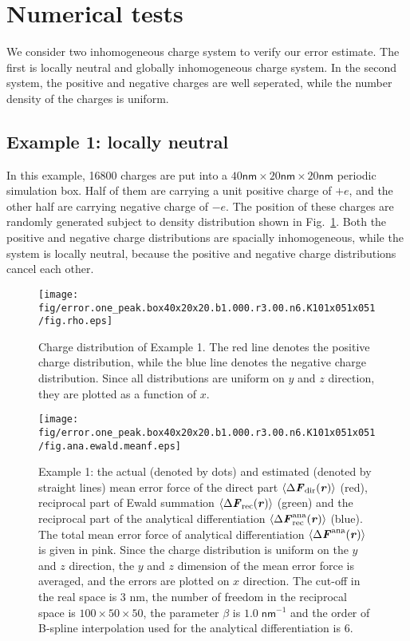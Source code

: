 \documentclass[aps,pre,preprint]{revtex4-1}
\renewcommand{\v}[1]{\textbf{\textit{#1}}}
\begin{document}
\section{Numerical tests}

We consider two inhomogeneous charge system to verify our error
estimate.  The first is locally neutral and globally inhomogeneous
charge system. In the second system, the positive and negative charges
are well seperated, while the number density of the charges is
uniform.

\subsection{Example 1: locally neutral}

In this example, 16800 charges are put into a $40\textsf{nm}\times
20\textsf{nm}\times 20\textsf{nm}$ periodic simulation box. Half of
them are carrying a unit positive charge of $+e$, and the other half
are carrying negative charge of $-e$. The position of these charges
are randomly generated subject to density distribution shown in
Fig.~\ref{fig:tmp-rho0}. Both the positive and negative charge
distributions are spacially inhomogeneous, while the system is locally
neutral, because the positive and negative charge distributions cancel
each other.

\begin{figure}
  \centering
  \texttt{[image: fig/error.one\_peak.box40x20x20.b1.000.r3.00.n6.K101x051x051/fig.rho.eps]}
  \caption{Charge distribution of Example 1. The red line
    denotes the positive charge distribution, while the blue line
    denotes the negative charge distribution. Since all distributions
    are uniform on $y$ and $z$ direction, they are plotted as a
    function of $x$.}
  \label{fig:tmp-rho0}
\end{figure}

\begin{figure}
  \centering
  \texttt{[image: fig/error.one\_peak.box40x20x20.b1.000.r3.00.n6.K101x051x051/fig.ana.ewald.meanf.eps]}
  \caption{Example 1: the actual (denoted by dots) and estimated
    (denoted by straight lines) mean error force of the direct part
    $\langle\Delta \v F_{\textrm{dir}}(\v r)\rangle$ (red), reciprocal
    part of Ewald summation $\langle\Delta \v F_{\textrm{rec}}(\v
    r)\rangle$ (green) and the reciprocal part of the analytical
    differentiation $\langle\Delta \v
    F^{\textrm{ana}}_{\textrm{rec}}(\v r)\rangle$ (blue). The total
    mean error force of analytical differentiation $\langle\Delta \v
    F^{\textrm{ana}}(\v r)\rangle$ is given in pink.  Since the charge
    distribution is uniform on the $y$ and $z$ direction, the $y$ and
    $z$ dimension of the mean error force is averaged, and the errors
    are plotted on $x$ direction.  The cut-off in the real space is 3
    \textsf{nm}, the number of freedom in the reciprocal space is
    $100\times 50\times 50$, the parameter $\beta$ is $1.0\;
    \textsf{nm}^{-1}$ and the order of B-spline interpolation used for
    the analytical differentiation is 6.}
  \label{fig:meanf1}
\end{figure}
\end{document}
